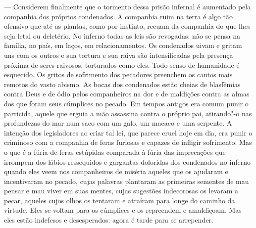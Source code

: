  --- Considerem finalmente que o tormento dessa prisão infernal é aumentado
pela companhia dos próprios condenados. A companhia ruim na terra é
algo tão ofensivo que até as plantas, como por instinto, recuam da
companhia do que lhes seja letal ou deletério. No inferno todas as leis
são revogadas: não se pensa na família, no país, em laços, em
relacionamentos. Os condenados uivam e gritam uns com os outros e sua
tortura e sua raiva são intensificadas pela presença próxima de seres
raivosos, torturados como eles. Todo senso de humanidade é esquecido.
Os gritos de sofrimento dos pecadores preenchem os cantos mais remotos
do vasto abismo. As bocas dos condenados estão cheias de blasfêmias
contra Deus e de ódio pelos companheiros na dor e de maldições contra
as almas dos que foram seus cúmplices no pecado. Em tempos antigos era
comum punir o parricida, aquele que erguia a mão assassina contra o
próprio pai, atirando"-o nas profundezas do mar num saco com um
galo, um macaco e uma serpente. A intenção dos legisladores ao criar
tal lei, que parece cruel hoje em dia, era punir o criminoso com a
companhia de feras furiosas e capazes de infligir sofrimento. Mas o que
é a fúria de feras estúpidas comparada à fúria das imprecações que
irrompem dos lábios ressequidos e gargantas doloridas dos condenados no
inferno quando eles veem nos companheiros de miséria aqueles que os
ajudaram e incentivaram no pecado, cujas palavras plantaram as
primeiras sementes de mau pensar e mau viver em suas mentes, cujas
sugestões indecorosas os levaram a pecar, aqueles cujos olhos os
tentaram e atraíram para longe do caminho da virtude. Eles se voltam
para os cúmplices e os repreendem e amaldiçoam. Mas eles estão
indefesos e desesperados: agora é tarde para se arrepender.

